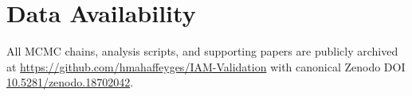 \documentclass[12pt,a4paper]{article}
\begin{document}
\section*{Data Availability}

All MCMC chains, analysis scripts, and supporting papers are publicly
archived at \url{https://github.com/hmahaffeyges/IAM-Validation} with
canonical Zenodo DOI
\href{https://doi.org/10.5281/zenodo.18702042}{10.5281/zenodo.18702042}.



\end{document}

